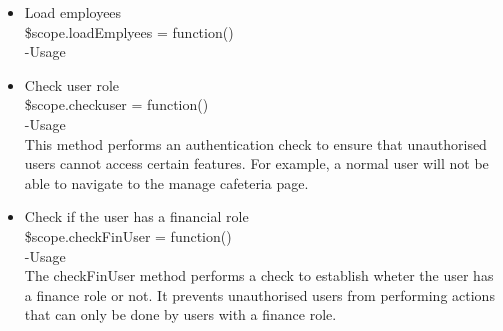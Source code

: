 \documentclass[a4paper,12pt]{article}
\begin{document}
\begin{enumerate}
\begin{itemize}
\item Load employees\\
 \$scope.loadEmplyees = function()\\
-Usage\\

\item Check user role\\
 \$scope.checkuser = function()\\
-Usage\\
This method performs an authentication check to ensure that unauthorised users cannot access certain features. For example, a normal user will not be able to navigate to the manage cafeteria page.

\item Check if the user has a financial role\\
 \$scope.checkFinUser = function()\\
-Usage\\
The checkFinUser method performs a check to establish wheter the user has a finance role or not. It prevents unauthorised users from performing actions that can only be done by users with a finance role.
	\end{itemize}
 \end{enumerate}
\end{document}
